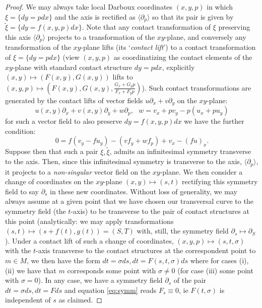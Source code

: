 \documentclass[10pt]{amsart}
\newcommand{\s}{\sigma}
\newcommand{\del}{\partial}
\theoremstyle{definition}
\begin{document}
\begin{proof}
    We may always take local Darboux coordinates $(x,y,p)$ in which $\xi = \{ dy = pdx\}$ and the axis is rectified as $\langle \del_p\rangle$ so that its pair is given by $\tilde\xi = \{ dy = f(x,y,p)dx\}$. Note that any contact transformation of $\xi$ preserving this axis $\langle\del_p \rangle$ projects to a transformation of the $xy$-plane, and conversely any transformation of the $xy$-plane lifts (its `{\em contact lift}') to a contact transformation of $\xi = \{ dy = pdx\}$ (view $(x,y,p)$ as coordinatizing the contact elements of the $xy$-plane with standard contact structure $dy = pdx$, explicitly $(x,y)\mapsto (F(x,y), G(x,y))$ lifts to $(x,y,p)\mapsto (F(x,y), G(x,y), \frac{G_x + G_y p}{F_x + F_y p})$). Such contact transformations are generated by the contact lifts of vector fields $u\del_x + v\del_y$ on the $xy$-plane:
    \[ u(x,y)\del_x + v(x,y) \del_y + w \del_p , ~~~w = v_x + p v_y - p( u_x + p u_y) \]
    for such a vector field to also preserve $dy = f(x,y,p)dx$ we have the further condition:
    \begin{equation}\label{eq:symm}
        0 = f(v_y - fu_y) - (v f_y + w f_p) + v_x - (fu)_x.
    \end{equation}
    Suppose then that such a pair $\xi, \tilde \xi$,  admits an infinitesimal symmetry transverse to the axis. Then, since this infinitesimal symmetry is transverse to the axis, $\langle \del_p\rangle$, it projects to a {\em non-singular} vector field on the $xy$-plane. We then consider a change of coordinates on the $xy$-plane $(x,y)\mapsto (s, t)$ rectifying this symmetry field to say $\del_s$ in these new coordinates. Without loss of generality, we may always assume at a given point that we have chosen our transversal curve to the symmetry field (the $t$-axis) to be transverse to the pair of contact structures at this point (analytically: we may apply transformations $(s,t)\mapsto (s+f(t), g(t)) = (S, T)$ with, still, the symmetry field $\del_s\mapsto \del_S$). Under a contact lift of such a change of coordinates, $(x,y,p)\mapsto (s,t,\s)$ with the $t$-axis transverse to the contact structures at the correspondent point to $m\in M$, we then have the form $dt = \s ds, dt = F(s,t,\s)ds$ where for cases (i), (ii) we have that $m$ corresponds some point with $\s\ne 0$ (for case (iii) some point with $\s = 0$). In any case, we have a symmetry field $\del_s$ of the pair $dt = \s ds, dt = F ds$ and equation \eqref{eq:symm} reads $F_s \equiv 0$, ie $F(t,\s)$ is independent of $s$ as claimed.
\end{proof}
\end{document}

